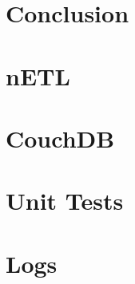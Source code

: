 \documentclass[
    a4paper,
    12pt
]{extreport}
\begin{document}



\chapter{Conclusion}



\newpage




\begin{appendices}
    \chapter{nETL}
    
    
    \chapter{CouchDB}
    
    \chapter{Unit Tests}
    \label{unit-tests}
    
    \chapter{Logs}
    
\end{appendices}

\end{document}
